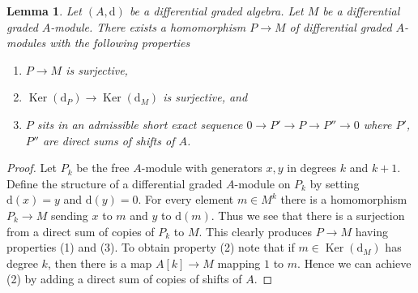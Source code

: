 \documentclass{stacks-project}
\theoremstyle{plain}
\newtheorem{lemma}[subsection]{Lemma}
\theoremstyle{definition}
\theoremstyle{remark}
\numberwithin{equation}{subsection}
\def\Ker{\mathop{\mathrm{Ker}}}
\begin{document}
\begin{lemma}
\label{lemma-good-quotient}
Let $(A, \text{d})$ be a differential graded algebra.
Let $M$ be a differential graded $A$-module. There exists a homomorphism
$P \to M$ of differential graded $A$-modules with the following
properties
\begin{enumerate}
\item $P \to M$ is surjective,
\item $\Ker(\text{d}_P) \to \Ker(\text{d}_M)$ is surjective, and
\item $P$ sits in an admissible short exact sequence
$0 \to P' \to P \to P'' \to 0$ where $P'$, $P''$ are direct sums
of shifts of $A$.
\end{enumerate}
\end{lemma}

\begin{proof}
Let $P_k$ be the free $A$-module with generators $x, y$ in degrees
$k$ and $k + 1$. Define the structure of a differential graded
$A$-module on $P_k$ by setting $\text{d}(x) = y$ and $\text{d}(y) = 0$.
For every element $m \in M^k$ there is a homomorphism
$P_k \to M$ sending $x$ to $m$ and $y$ to $\text{d}(m)$.
Thus we see that there is a surjection from a direct sum
of copies of $P_k$ to $M$. This clearly produces $P \to M$
having properties (1) and (3). To obtain property (2) note
that if $m \in \Ker(\text{d}_M)$ has degree $k$, then there is a map
$A[k] \to M$ mapping $1$ to $m$. Hence we can achieve (2) by adding
a direct sum of copies of shifts of $A$.
\end{proof}
\end{document}

